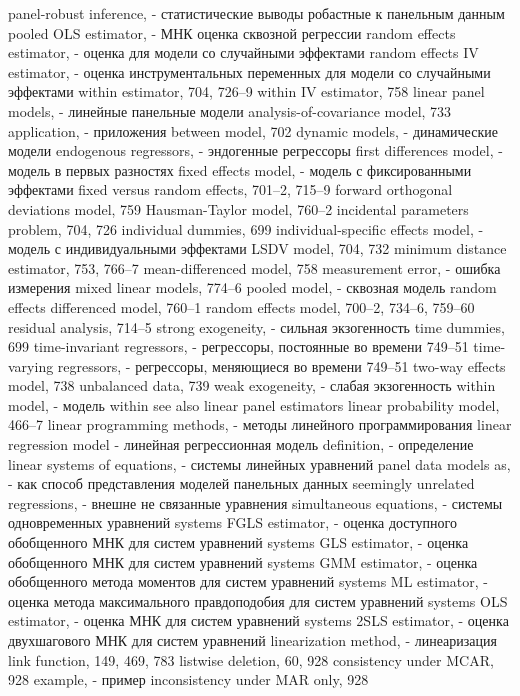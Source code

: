 panel-robust inference, - статистические выводы робастные к панельным данным
pooled OLS estimator, - МНК оценка сквозной регрессии
random effects estimator, - оценка для модели со случайными эффектами
random effects IV estimator, - оценка инструментальных переменных для модели со случайными эффектами
within estimator, 704, 726–9
within IV estimator, 758
linear panel models, - линейные панельные модели
analysis-of-covariance model, 733 
application, - приложения
between model, 702
dynamic models, - динамические модели
endogenous regressors, - эндогенные регрессоры
first differences model, - модель в первых разностях
fixed effects model, - модель с фиксированными эффектами 
fixed versus random effects, 701–2, 715–9 forward orthogonal deviations model, 759 Hausman-Taylor model, 760–2
incidental parameters problem, 704, 726 individual dummies, 699
individual-specific effects model, - модель с индивидуальными эффектами
LSDV model, 704, 732
minimum distance estimator, 753, 766–7 
mean-differenced model, 758
measurement error, - ошибка измерения
mixed linear models, 774–6
pooled model, - сквозная модель
random effects differenced model, 760–1 random effects model, 700–2, 734–6, 759–60 residual analysis, 714–5
strong exogeneity, - сильная экзогенность
time dummies, 699
time-invariant regressors, - регрессоры, постоянные во времени 
749–51 time-varying regressors, - регрессоры, меняющиеся во времени 
749–51 two-way effects model, 738
unbalanced data, 739
weak exogeneity, - слабая экзогенность
within model, - модель within
see also linear panel estimators
linear probability model, 466–7 
linear programming methods, - методы линейного программирования 
linear regression model - линейная регрессионная модель
definition, - определение
linear systems of equations, - системы линейных уравнений
panel data models as, - как способ представления моделей панельных данных
seemingly unrelated regressions, - внешне не связанные уравнения
simultaneous equations, - системы одновременных уравнений 
systems FGLS estimator, - оценка доступного обобщенного МНК для систем уравнений
systems GLS estimator, - оценка обобщенного МНК для систем уравнений
systems GMM estimator, - оценка обобщенного метода моментов для систем уравнений
systems ML estimator, - оценка  метода максимального правдоподобия для систем уравнений 
systems OLS estimator, - оценка МНК для систем уравнений
systems 2SLS estimator, - оценка двухшагового МНК для систем уравнений
linearization method, - линеаризация
link function, 149, 469, 783 
listwise deletion, 60, 928
consistency under MCAR, 928 
example, - пример
inconsistency under MAR only, 928
